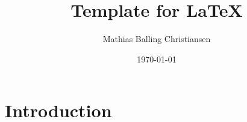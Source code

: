 \documentclass{article}
\title{Template for \LaTeX}
\author{Mathias Balling Christiansen}
\date{\today}
\begin{document}
\maketitle
\tableofcontents
\newpage
\section{Introduction}
\end{document}
